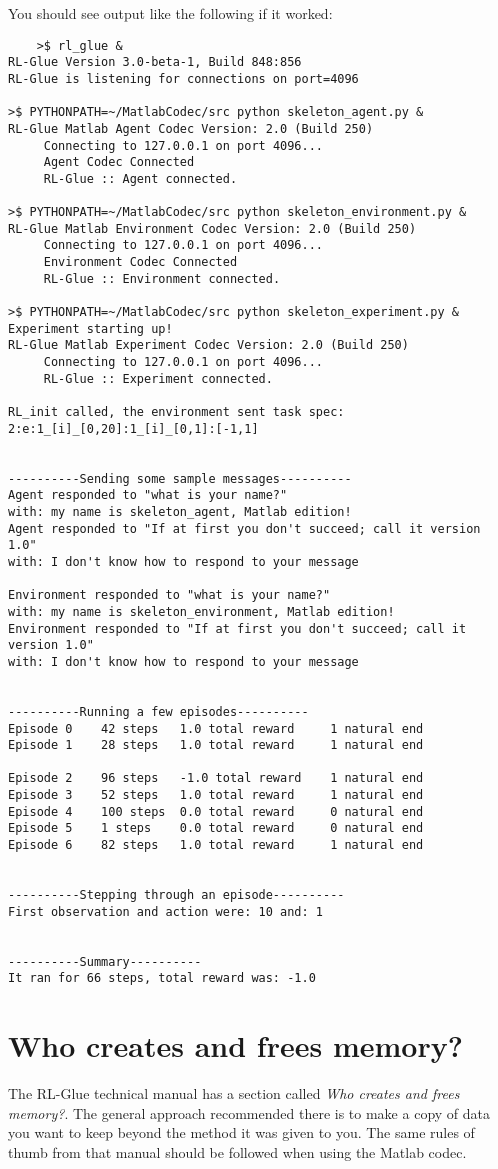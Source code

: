 \documentclass[11pt]{article}
\begin{document}
You should see output like the following if it worked:
\begin{verbatim}
	>$ rl_glue &
RL-Glue Version 3.0-beta-1, Build 848:856
RL-Glue is listening for connections on port=4096

>$ PYTHONPATH=~/MatlabCodec/src python skeleton_agent.py &
RL-Glue Matlab Agent Codec Version: 2.0 (Build 250)
     Connecting to 127.0.0.1 on port 4096...
     Agent Codec Connected
     RL-Glue :: Agent connected.

>$ PYTHONPATH=~/MatlabCodec/src python skeleton_environment.py &
RL-Glue Matlab Environment Codec Version: 2.0 (Build 250)
     Connecting to 127.0.0.1 on port 4096...
     Environment Codec Connected
     RL-Glue :: Environment connected.

>$ PYTHONPATH=~/MatlabCodec/src python skeleton_experiment.py &
Experiment starting up!
RL-Glue Matlab Experiment Codec Version: 2.0 (Build 250)
     Connecting to 127.0.0.1 on port 4096...
     RL-Glue :: Experiment connected.

RL_init called, the environment sent task spec: 2:e:1_[i]_[0,20]:1_[i]_[0,1]:[-1,1]


----------Sending some sample messages----------
Agent responded to "what is your name?" 
with: my name is skeleton_agent, Matlab edition!
Agent responded to "If at first you don't succeed; call it version 1.0" 
with: I don't know how to respond to your message

Environment responded to "what is your name?" 
with: my name is skeleton_environment, Matlab edition!
Environment responded to "If at first you don't succeed; call it version 1.0" 
with: I don't know how to respond to your message


----------Running a few episodes----------
Episode 0	 42 steps 	1.0 total reward	 1 natural end
Episode 1	 28 steps 	1.0 total reward	 1 natural end

Episode 2	 96 steps 	-1.0 total reward	 1 natural end
Episode 3	 52 steps 	1.0 total reward	 1 natural end
Episode 4	 100 steps 	0.0 total reward	 0 natural end
Episode 5	 1 steps 	0.0 total reward	 0 natural end
Episode 6	 82 steps 	1.0 total reward	 1 natural end


----------Stepping through an episode----------
First observation and action were: 10 and: 1


----------Summary----------
It ran for 66 steps, total reward was: -1.0
\end{verbatim}


\section{Who creates and frees memory?}
The RL-Glue technical manual has a section called \textit{Who creates and frees memory?}.  The general approach recommended there is to make a copy of data
you want to keep beyond the method it was given to you.  The same rules of thumb from that manual should be followed when using the Matlab codec.
\end{document}
